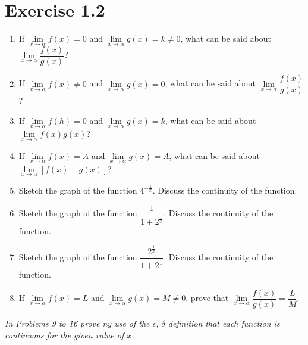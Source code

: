 \documentclass{report}
\begin{document}
\section{Exercise 1.2}
\begin{enumerate}
      \item If $\lim\limits_{x \to \alpha}f(x) = 0$ and $\lim\limits_{x \to \alpha}g(x) = k
                  \neq 0$, what can be said about $\lim\limits_{x \to \alpha}\dfrac{f(x)}{g(x)}$?
      \item If $\lim\limits_{x \to \alpha}f(x) \neq 0$ and $\lim\limits_{x \to \alpha}g(x)
                  = 0$, what can be said about $\lim\limits_{x \to \alpha}\dfrac{f(x)}{g(x)}$?
      \item If $\lim\limits_{x \to \alpha}f(h) = 0$ and $\lim\limits_{x \to \alpha}g(x) =
                  k$, what can be said about $\lim\limits_{x \to \alpha}{f(x)}{g(x)}$?
      \item If $\lim\limits_{x \to \alpha}f(x) = A$ and $\lim\limits_{x \to \alpha}g(x) =
                  A$, what can be said about $\lim\limits_{x \to \alpha}\left[f(x) -
                        g(x)\right]$?
      \item Sketch the graph of the function $4^{-\frac{1}{x}}$. Discuss the continuity of
            the function.
      \item Sketch the graph of the function $\dfrac{1}{1 + 2^{\frac{1}{x}}}$. Discuss the
            continuity of the function.
      \item Sketch the graph of the function $\dfrac{2^{\frac{1}{x}}}{1 +
                        2^{\frac{1}{x}}}$. Discuss the continuity of the function.
      \item If $\lim\limits_{x \to \alpha}f(x) = L$ and $\lim\limits_{x \to \alpha}g(x) = M
                  \neq 0$, prove that $\lim\limits_{x \to \alpha}\dfrac{f(x)}{g(x)} =
                  \dfrac{L}{M}$.
\end{enumerate}
\textit{In Problems 9 to 16 prove ny use of the $\epsilon$, $\delta$ definition that each function is continuous for the given value of $x$.}
\end{document}
